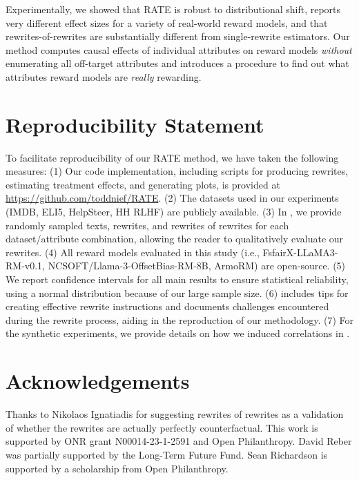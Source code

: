 \documentclass{article}
\begin{document}
Experimentally, we showed that RATE is robust to distributional shift, reports very different effect sizes for a variety of real-world reward models, and that rewrites-of-rewrites are substantially different from single-rewrite estimators. Our method computes causal effects of individual attributes on reward models \emph{without} enumerating all off-target attributes and introduces a procedure to find out what attributes reward models are \emph{really} rewarding.

\section*{Reproducibility Statement}
To facilitate reproducibility of our RATE method, we have taken the following measures: (1) Our code implementation, including scripts for producing rewrites, estimating treatment effects, and generating plots, is provided at \url{https://github.com/toddnief/RATE}. (2) The datasets used in our experiments (IMDB, ELI5, HelpSteer, HH RLHF) are publicly available. (3) In , we provide randomly sampled texts, rewrites, and rewrites of rewrites for each dataset/attribute combination, allowing the reader to qualitatively evaluate our rewrites. (4) All reward models evaluated in this study (i.e., FsfairX-LLaMA3-RM-v0.1, NCSOFT/Llama-3-OffsetBias-RM-8B, ArmoRM) are open-source. (5) We report confidence intervals for all main results to ensure statistical reliability, using a normal distribution because of our large sample size. (6)  includes tips for creating effective rewrite instructions and documents challenges encountered during the rewrite process, aiding in the reproduction of our methodology. (7) For the synthetic experiments, we provide details on how we induced correlations in .

\section*{Acknowledgements}
Thanks to Nikolaos Ignatiadis for suggesting rewrites of rewrites as a validation of whether the rewrites are actually perfectly counterfactual. This work is supported by ONR grant N00014-23-1-2591 and Open Philanthropy. David Reber was partially supported by the Long-Term Future Fund. Sean Richardson is supported by a scholarship from Open Philanthropy.



\end{document}
